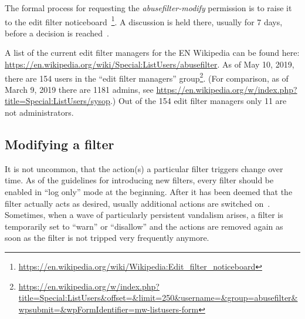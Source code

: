 The formal process for requesting the \emph{abusefilter-modify} permission is to raise it to the edit filter noticeboard~\footnote{\url{https://en.wikipedia.org/wiki/Wikipedia:Edit_filter_noticeboard}}.
A discussion is held there, usually for 7 days, before a decision is reached~\cite{Wikipedia:EditFilter}.

A list of the current edit filter managers for the EN Wikipedia can be found here: \url{https://en.wikipedia.org/wiki/Special:ListUsers/abusefilter}.
As of May 10, 2019, there are 154 users in the ``edit filter managers'' group\footnote{\url{https://en.wikipedia.org/w/index.php?title=Special:ListUsers&offset=&limit=250&username=&group=abusefilter&wpsubmit=&wpFormIdentifier=mw-listusers-form}}.
(For comparison, as of March 9, 2019 there are 1181 admins, see \url{https://en.wikipedia.org/w/index.php?title=Special:ListUsers/sysop}.)
Out of the 154 edit filter managers only 11 are not administrators.

\subsection{Modifying a filter}
It is not uncommon, that the action(s) a particular filter triggers change over time.
As of the guidelines for introducing new filters, every filter should be enabled in ``log only'' mode at the beginning.
After it has been deemed that the filter actually acts as desired, usually additional actions are switched on~\cite{Wikipedia:EditFilterInstructions}.
Sometimes, when a wave of particularly persistent vandalism arises, a filter is temporarily set to ``warn'' or ``disallow'' and the actions are removed again as soon as the filter is not tripped very frequently anymore. %

